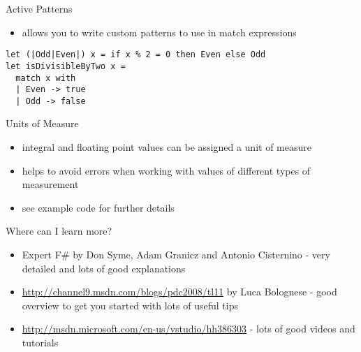 \documentclass[landscape]{slides}
\begin{document}
\begin{slide}{Active Patterns}
\begin{itemize}
\item allows you to write custom patterns to use in match expressions
\end{itemize}
\begin{verbatim}
let (|Odd|Even|) x = if x % 2 = 0 then Even else Odd
let isDivisibleByTwo x = 
  match x with 
  | Even -> true 
  | Odd -> false
\end{verbatim}
\end{slide}

\begin{slide}{Units of Measure}
\begin{itemize}
\item integral and floating point values can be assigned a unit of measure
\item helps to avoid errors when working with values of different types of measurement
\item see example code for further details
\end{itemize}
\end{slide}

\begin{slide}{Where can I learn more?}
\begin{itemize}
\item Expert F\# by Don Syme, Adam Granicz and Antonio Cisternino - very detailed and lots of good explanations
\item \href{http://channel9.msdn.com/blogs/pdc2008/tl11}{http://channel9.msdn.com/blogs/pdc2008/tl11} by Luca Bolognese - good overview to get you started with lots of useful tips
\item \href{http://msdn.microsoft.com/en-us/vstudio/hh386303}{http://msdn.microsoft.com/en-us/vstudio/hh386303} - lots of good videos and tutorials
\end{itemize}
\end{slide}
\end{document}
